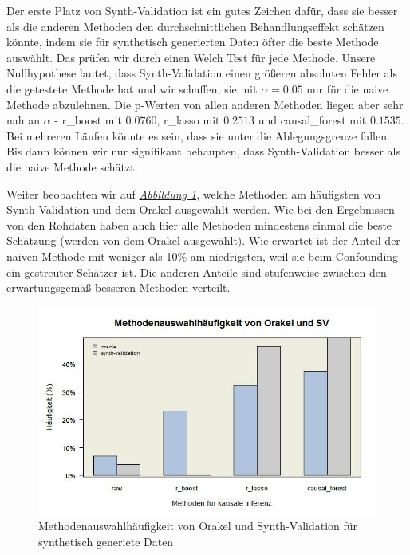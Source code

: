 \documentclass[12pt,a4paper,twoside]{scrartcl}
\numberwithin{equation}{section}
\newcommand{\reffig}[1]{\emph{\hyperref[#1]{Abbildung \ref*{#1}}}}
\begin{document}
\noindent
Der erste Platz von Synth-Validation ist ein gutes Zeichen dafür, dass sie besser als die anderen Methoden den durchschnittlichen Behandlungseffekt schätzen könnte, indem sie für synthetisch generierten Daten öfter die beste Methode auswählt. Das prüfen wir durch einen Welch Test für jede Methode. Unsere Nullhypothese lautet, dass Synth-Validation einen größeren absoluten Fehler als die getestete Methode hat und wir schaffen, sie  mit $\alpha = 0.05$ nur für die naive Methode abzulehnen. Die p-Werten von allen anderen Methoden liegen aber sehr nah an $\alpha$ - r\_boost mit $0.0760$, r\_lasso mit $0.2513$ und causal\_forest mit $0.1535$. Bei mehreren Läufen könnte es sein, dass sie unter die Ablegungsgrenze fallen. Bis dann können wir nur signifikant behaupten, dass Synth-Validation besser als die naive Methode schätzt.\par

\noindent
Weiter beobachten wir auf \reffig{fig:generatedDataBarplot}, welche Methoden am häufigsten von Synth-Validation und dem Orakel ausgewählt werden. Wie bei den Ergebnissen von den Rohdaten haben auch hier alle Methoden mindestens einmal die beste Schätzung (werden von dem Orakel ausgewählt). Wie erwartet ist der Anteil der naiven Methode mit weniger als 10\% am niedrigsten, weil sie beim Confounding ein gestreuter Schätzer ist. Die anderen Anteile sind stufenweise zwischen den erwartungsgemäß besseren Methoden verteilt.\par 


\begin{center}
\begin{figure}[h]
    \centering
    \includegraphics[height=0.5\textwidth, width=1\textwidth]{figures/plots/generatedDataBarplot.jpeg}
    \caption[Methodenauswahlhäufigkeit von Orakel und Synth-Validation für synthetisch generiete Daten]{Methodenauswahlhäufigkeit von Orakel und Synth-Validation für synthetisch generiete Daten}\label{fig:generatedDataBarplot}
  \end{figure}
\end{center}
\end{document}
